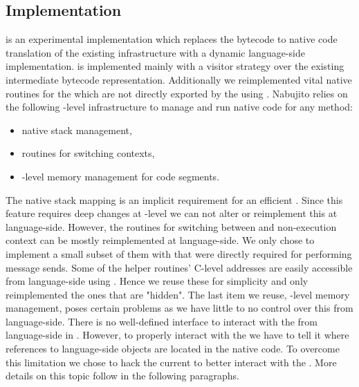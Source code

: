 \subsection{\NBJ Implementation}
\NBJ is an experimental \JIT implementation which replaces the bytecode to native code translation of the existing \JIT infrastructure with a dynamic language-side implementation.
\NBJ is implemented mainly with a visitor strategy over the existing intermediate bytecode representation. 
Additionally we reimplemented vital native routines for the \JIT which are not directly exported by the \VM using \B. 
Nabujito relies on the following \VM-level infrastructure to manage and run native code for any \PH method:

\begin{itemize}[noitemsep,nolistsep]
	\item native stack management,
	\item routines for switching contexts,
	\item \JIT-level memory management for code segments.
\end{itemize}

\noindent The native stack mapping is an implicit requirement for an efficient \JIT.
Since this feature requires deep changes at \VM-level we can not alter or reimplement this at language-side.
However, the routines for switching between \JIT and non-\JIT execution context can be mostly reimplemented at language-side.
We only chose to implement a small subset of them with \B that were directly required for performing message sends.
Some of the helper routines' C-level addresses are easily accessible from language-side using .
Hence we reuse these for simplicity and only reimplemented the ones that are "hidden".
The last item we reuse, \JIT-level memory management, poses certain problems as we have little to no control over this from language-side.
There is no well-defined interface to interact with the \JIT from language-side in \PH.
However, to properly interact with the \JIT we have to tell it where references to language-side objects are located in the native code.
To overcome this limitation we chose to hack the current \VM to better interact with the \JIT.
More details on this topic follow in the following paragraphs.

